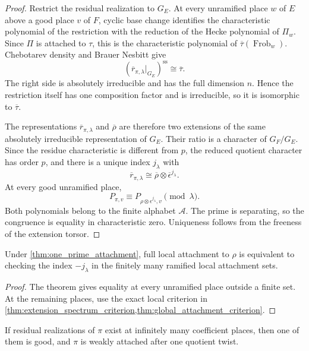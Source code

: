 \documentclass{aomart}
\theoremstyle{definition}
\theoremstyle{remark}
\newcommand{\Frob}{\operatorname{Frob}}
\newcommand{\calA}{\mathcal A}
\begin{document}
\begin{proof}
Restrict the residual realization to \(G_E\). At every unramified place \(w\) of \(E\) above a good place \(v\) of \(F\), cyclic base change identifies the characteristic polynomial of the restriction with the reduction of the Hecke polynomial of \(\Pi_w\). Since \(\Pi\) is attached to \(\tau\), this is the characteristic polynomial of \(\overline\tau(\Frob_w)\). Chebotarev density and Brauer Nesbitt give
\[
\left(
\overline r_{\pi,\lambda}|_{G_E}
\right)^{\mathrm{ss}}
\cong
\overline\tau.
\]
The right side is absolutely irreducible and has the full dimension \(n\). Hence the restriction itself has one composition factor and is irreducible, so it is isomorphic to \(\overline\tau\).

The representations \(\overline r_{\pi,\lambda}\) and \(\overline\rho\) are therefore two extensions of the same absolutely irreducible representation of \(G_E\). Their ratio is a character of \(G_F/G_E\). Since the residue characteristic is different from \(p\), the reduced quotient character has order \(p\), and there is a unique index \(j_{\lambda}\) with
\[
\overline r_{\pi,\lambda}
\cong
\overline\rho\otimes\overline\epsilon^{j_{\lambda}}.
\]
At every good unramified place,
\[
P_{\pi,v}
\equiv
P_{\rho\otimes\epsilon^{j_{\lambda}},v}
\pmod\lambda.
\]
Both polynomials belong to the finite alphabet \(\calA\). The prime is separating, so the congruence is equality in characteristic zero. Uniqueness follows from the freeness of the extension torsor.
\end{proof}

\begin{corollary}\label{cor:finitely_many_local_checks}
Under \cref{thm:one_prime_attachment}, full local attachment to \(\rho\) is equivalent to checking the index \(-j_{\lambda}\) in the finitely many ramified local attachment sets.
\end{corollary}

\begin{proof}
The theorem gives equality at every unramified place outside a finite set. At the remaining places, use the exact local criterion in \cref{thm:extension_spectrum_criterion,thm:global_attachment_criterion}.
\end{proof}

\begin{corollary}\label{cor:infinitely_many_residual}
If residual realizations of \(\pi\) exist at infinitely many coefficient places, then one of them is good, and \(\pi\) is weakly attached after one quotient twist.
\end{corollary}
\end{document}
